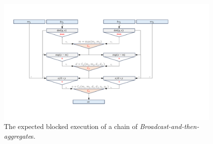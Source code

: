 






\begin{figure}[h]
    \centering
    \includegraphics[width=1\textwidth]{figures/attention_expression_tree2.pdf}
    \caption{The expected blocked execution of a chain of \textit{Broadcast-and-then-aggregate}s.} \label{fused-map-and-aggreage}
\end{figure}

